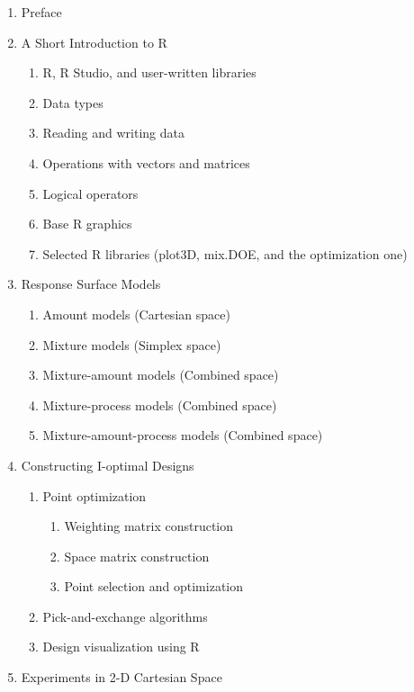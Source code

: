 \documentclass[
  letterpaper,
  DIV=11,
  numbers=noendperiod]{scrreprt}
\begin{document}
\begin{enumerate}
\def\labelenumi{\arabic{enumi}.}
\item
  Preface
\item
  A Short Introduction to R

  \begin{enumerate}
  \def\labelenumii{\arabic{enumii}.}
  \item
    R, R Studio, and user-written libraries
  \item
    Data types
  \item
    Reading and writing data
  \item
    Operations with vectors and matrices
  \item
    Logical operators
  \item
    Base R graphics
  \item
    Selected R libraries (plot3D, mix.DOE, and the optimization one)
  \end{enumerate}
\item
  Response Surface Models

  \begin{enumerate}
  \def\labelenumii{\arabic{enumii}.}
  \item
    Amount models (Cartesian space)
  \item
    Mixture models (Simplex space)
  \item
    Mixture-amount models (Combined space)
  \item
    Mixture-process models (Combined space)
  \item
    Mixture-amount-process models (Combined space)
  \end{enumerate}
\item
  Constructing I-optimal Designs

  \begin{enumerate}
  \def\labelenumii{\arabic{enumii}.}
  \item
    Point optimization

    \begin{enumerate}
    \def\labelenumiii{\arabic{enumiii}.}
    \item
      Weighting matrix construction
    \item
      Space matrix construction
    \item
      Point selection and optimization
    \end{enumerate}
  \item
    Pick-and-exchange algorithms
  \item
    Design visualization using R
  \end{enumerate}
\item
  Experiments in 2-D Cartesian Space


\end{enumerate}
\end{document}
